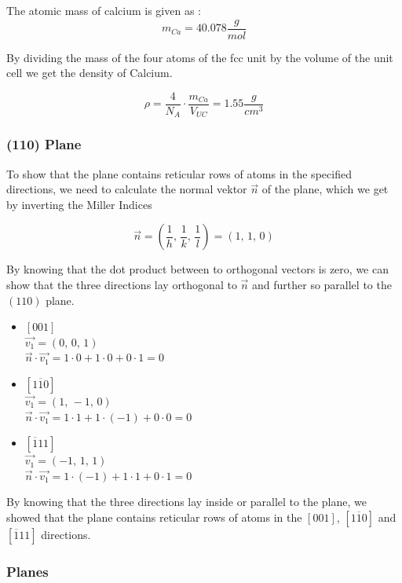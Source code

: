 The atomic mass of calcium is given as \cite{lenntech_chemical_elements}:
$$m_{Ca} = 40.078 \frac{g}{mol}$$

By dividing the mass of the four atoms of the fcc unit by the volume of the
unit cell we get the density of Calcium.

$$\rho = \frac{4}{N_A} \cdot \frac{m_{Ca}}{V_{UC}} = 1.55 \frac{g}{cm^3}$$

\subsubsection*{(110) Plane}

To show that the plane contains reticular rows of atoms in the specified
directions, we need to calculate the normal
vektor $\vec{n}$ of the plane, which we get by inverting the Miller Indices

$$\vec{n} = (\frac{1}{h} ,\, \frac{1}{k} ,\, \frac{1}{l}) = (1, \, 1,\, 0)$$

By knowing that the dot product between to orthogonal vectors is zero, we can show
that the three directions lay orthogonal to $\vec{n}$ and further so parallel
to the $(110)$ plane.

\begin{itemize}
	\item 	$[001]$\\
			$\vec{v_1} = (0, \, 0,\, 1)$\\
			$\vec{n} \cdot \vec{v_1} = 1 \cdot 0 + 1 \cdot 0 + 0 \cdot 1 = 0$
\end{itemize}
\begin{itemize}
	\item 	$[1\overline{1}0]$\\
			$\vec{v_1} = (1, \, -1,\, 0)$\\
			$\vec{n} \cdot \vec{v_1} = 1 \cdot 1 + 1 \cdot (-1) + 0 \cdot 0 = 0$
\end{itemize}
\begin{itemize}
	\item 	$[\overline{1}11]$\\
			$\vec{v_1} = (-1, \, 1,\, 1)$\\
			$\vec{n} \cdot \vec{v_1} = 1 \cdot (-1) + 1 \cdot 1 + 0 \cdot 1 = 0$
\end{itemize}

By knowing that the three directions lay inside or parallel to the plane, we
showed that the plane contains reticular rows of atoms in the $[001]$, $[1\overline{1}0]$
and $[\overline{1}11]$ directions.

\subsubsection*{Planes}


